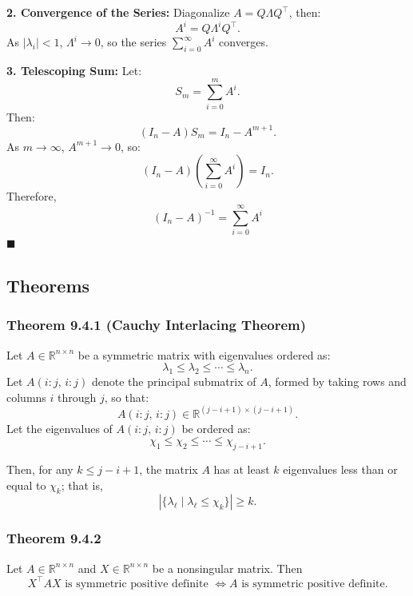 \documentclass[hidelinks,12pt]{article}
\begin{document}
\noindent \textbf{2. Convergence of the Series:}  
Diagonalize \( A = Q \Lambda Q^\top \), then:
\[
A^i = Q \Lambda^i Q^\top.
\]
As \( |\lambda_i| < 1 \), \( \Lambda^i \to 0 \), so the series \( \sum_{i=0}^\infty A^i \) converges.

\noindent \textbf{3. Telescoping Sum:}  
Let:
\[
S_m = \sum_{i=0}^{m} A^i.
\]
Then:
\[
(I_n - A) S_m = I_n - A^{m+1}.
\]
As \( m \to \infty \), \( A^{m+1} \to 0 \), so:
\[
(I_n - A) \left( \sum_{i=0}^{\infty} A^i \right) = I_n.
\]
Therefore,
\[
(I_n - A)^{-1} = \sum_{i=0}^{\infty} A^i
\] \hfill \(\blacksquare\)
\newpage
\subsection{Theorems}


\subsubsection*{\large\textbf{Theorem 9.4.1 (Cauchy Interlacing Theorem)}}
Let \( A \in \mathbb{R}^{n \times n} \) be a symmetric matrix with eigenvalues ordered as:
\[
\lambda_1 \leq \lambda_2 \leq \cdots \leq \lambda_n.
\]
Let \( A(i{:}j,\,i{:}j) \) denote the principal submatrix of \( A \), formed by taking rows and columns \( i \) through \( j \), so that:
\[
A(i{:}j,\,i{:}j) \in \mathbb{R}^{(j-i+1) \times (j-i+1)}.
\]
Let the eigenvalues of \( A(i{:}j,\,i{:}j) \) be ordered as:
\[
\chi_1 \leq \chi_2 \leq \cdots \leq \chi_{j-i+1}.
\]

\noindent Then, for any \( k \leq j - i + 1 \), the matrix \( A \) has at least \( k \) eigenvalues less than or equal to \( \chi_k \); that is,
\[
|\{ \lambda_\ell \mid \lambda_\ell \leq \chi_k \}| \geq k.
\]

\subsubsection*{\large\textbf{Theorem 9.4.2}} 

Let \( A \in \mathbb{R}^{n \times n} \) and \( X \in \mathbb{R}^{n \times n} \) be a nonsingular matrix. Then
\[
X^\top A X \text{ is symmetric positive definite } \iff A \text{ is symmetric positive definite}.
\]
\end{document}
